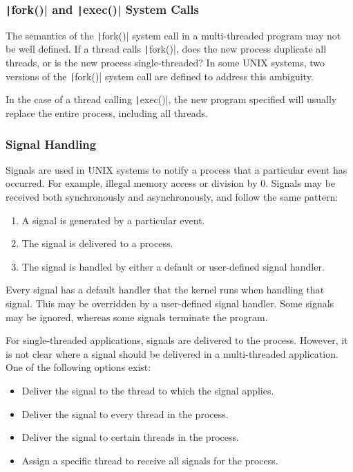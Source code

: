 \documentclass{article}
\begin{document}
\subsubsection{\texttt|fork()| and \texttt|exec()| System Calls}
The semantics of the \texttt|fork()| system call in a
multi-threaded program may not be well defined. If a thread calls
\texttt|fork()|, does the new process duplicate all threads, or
is the new process single-threaded? In some UNIX systems, two versions
of the \texttt|fork()| system call are defined to address this
ambiguity.

In the case of a thread calling \texttt|exec()|, the new program
specified will usually replace the entire process, including all
threads.
\subsubsection{Signal Handling}
Signals are used in UNIX systems to notify a process that a particular
event has occurred. For example, illegal memory access or division by
0. Signals may be received both synchronously and asynchronously, and
follow the same pattern:
\begin{enumerate}
    \item A signal is generated by a particular event.
    \item The signal is delivered to a process.
    \item The signal is handled by either a default or user-defined
          signal handler.
\end{enumerate}
Every signal has a default handler that the kernel runs when handling
that signal. This may be overridden by a user-defined signal handler.
Some signals may be ignored, whereas some signals terminate the program.

For single-threaded applications, signals are delivered to the process.
However, it is not clear where a signal should be delivered in a
multi-threaded application. One of the following options exist:
\begin{itemize}
    \item Deliver the signal to the thread to which the signal applies.
    \item Deliver the signal to every thread in the process.
    \item Deliver the signal to certain threads in the process.
    \item Assign a specific thread to receive all signals for the
          process.
\end{itemize}
\end{document}
